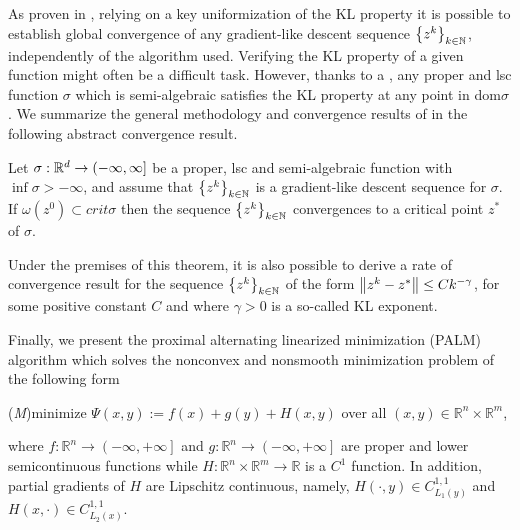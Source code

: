 As proven in \cite{BST2014}, relying on a key uniformization of the KL property it is possible to establish global convergence of any gradient-like descent sequence $\left\lbrace z^k \right\rbrace_{k \in \mathbb{N}}$, independently of the algorithm used. Verifying the KL property of a given function might often be a difficult task. However, thanks to a , any proper and lsc function $\sigma$ which is semi-algebraic satisfies the KL property at any point in dom$\sigma$. We summarize the general methodology and convergence results of \cite{BST2014} in the following abstract convergence result.

\begin{theorem}
Let $\sigma:\mathbb{R}^d \rightarrow (-\infty,\infty]$ be a proper, lsc and semi-algebraic function with $\inf \sigma > -\infty$, and assume that $\left\lbrace z^k \right\rbrace_{k \in \mathbb{N}}$ is a gradient-like descent sequence for $\sigma$. If $\omega\left( z^0 \right) \subset crit\sigma$ then the sequence $\left\lbrace z^k \right\rbrace_{k \in \mathbb{N}}$ convergences to a critical point $z^{*}$ of $\sigma$.
\end{theorem}

\begin{remark}
Under the premises of this theorem, it is also possible to derive a rate of convergence result for the sequence $\left\lbrace z^k \right\rbrace_{k \in \mathbb{N}}$ of the form $\left\Vert {z^k - z^{*}} \right\Vert \leq Ck^{-\gamma}$, for some positive constant $C$ and where $\gamma>0$ is a so-called KL exponent.
\end{remark}

Finally, we present the proximal alternating linearized minimization (PALM) algorithm which solves the nonconvex and nonsmooth minimization problem of the following form
\begin{center}
(\textit{M})\quad minimize $\Psi(x,y):=f(x)+g(y)+H(x,y)$ over all $(x,y) \in \mathbb{R}^n \times \mathbb{R}^m$,
\end{center}
where $f:\mathbb{R}^n \rightarrow \left(-\infty,+\infty\right]$ and $g:\mathbb{R}^n \rightarrow \left(-\infty,+\infty\right]$ are proper and lower semicontinuous functions while $H:\mathbb{R}^n \times \mathbb{R}^m \rightarrow \mathbb{R}$ is a $C^1$ function. In addition, partial gradients of $H$ are Lipschitz continuous, namely, $H(\cdot, y) \in C^{1,1}_{L_1(y)}$ and $H(x,\cdot) \in C^{1,1}_{L_2(x)}$.

